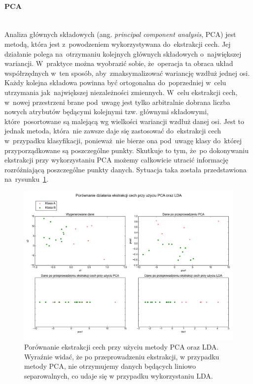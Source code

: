 \paragraph{PCA}\mbox{}\\
Analiza głównych składowych (ang. \textit{principal component analysis}, PCA)\cite{pcaReference} jest metodą, która jest z~powodzeniem wykorzystywana do~ekstrakcji cech. Jej działanie polega na~otrzymaniu kolejnych głównych składowych o~największej wariancji. W~praktyce można wyobrazić sobie, że~operacja ta obraca układ współrzędnych w~ten sposób, aby~zmaksymalizować wariancję wzdłuż jednej osi. Każdy kolejna składowa powinna być ortogonalna do~poprzedniej w~celu utrzymania jak~największej niezależności zmiennych. W~celu ekstrakcji cech, w~nowej przestrzeni brane pod~uwagę jest tylko arbitralnie dobrana liczba nowych atrybutów będącymi kolejnymi tzw. głównymi składowymi, które~posortowane są malejącą wg wielkości wariancji wzdłuż danej osi. Jest to jednak metoda, która~nie zawsze daje się zastosować do~ekstrakcji cech w~przypadku klasyfikacji, ponieważ~nie bierze ona pod~uwagę klasy do~której przyporządkowane są poszczególne punkty. Skutkuje to tym, że~po dokonywaniu ekstrakcji przy wykorzystaniu PCA możemy całkowicie utracić informację rozróżniającą poszczególne punkty danych. Sytuacja taka została przedstawiona na~rysunku~\ref{pcaIsShit}.


\begin{figure}[ht!]
\centering
\includegraphics[scale=0.5]{res/pcalda.png}
\caption[Caption for LOF]{Porównanie ekstrakcji cech przy użyciu metody PCA oraz LDA. Wyraźnie widać, że po przeprowadzeniu ekstrakcji, w przypadku metody PCA, nie otrzymujemy danych będących liniowo separowalnych, co udaje się w przypadku wykorzystaniu LDA.} \label{pcaIsShit} 
\end{figure}


